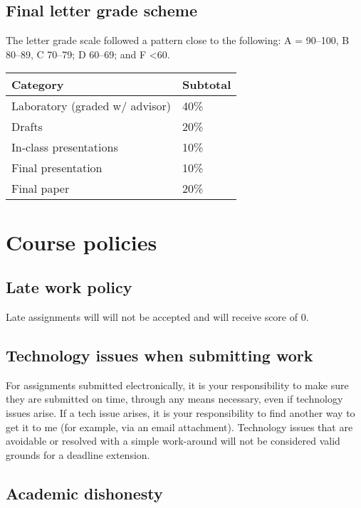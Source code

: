 \hypertarget{final-letter-grade-scheme}{%
\subsection{Final letter grade scheme}\label{final-letter-grade-scheme}}

The letter grade scale followed a pattern close to the following: A =
90--100, B 80--89, C 70--79; D 60--69; and F \textless60.

\begin{longtable}[]{@{}ll@{}}
\toprule
Category & Subtotal\tabularnewline
\midrule
\endhead
Laboratory (graded w/ advisor) & 40\%\tabularnewline
Drafts & 20\%\tabularnewline
In-class presentations & 10\%\tabularnewline
Final presentation & 10\%\tabularnewline
Final paper & 20\%\tabularnewline
\bottomrule
\end{longtable}

\hypertarget{course-policies}{%
\section{Course policies}\label{course-policies}}

\hypertarget{late-work-policy}{%
\subsection{Late work policy}\label{late-work-policy}}

Late assignments will will not be accepted and will receive score of 0.

\hypertarget{technology-issues-when-submitting-work}{%
\subsection{Technology issues when submitting
work}\label{technology-issues-when-submitting-work}}

For assignments submitted electronically, it is your responsibility to
make sure they are submitted on time, through any means necessary, even
if technology issues arise. If a tech issue arises, it is your
responsibility to find another way to get it to me (for example, via an
email attachment). Technology issues that are avoidable or resolved with
a simple work-around will not be considered valid grounds for a deadline
extension.

\hypertarget{academic-dishonesty}{%
\subsection{Academic dishonesty}\label{academic-dishonesty}}

